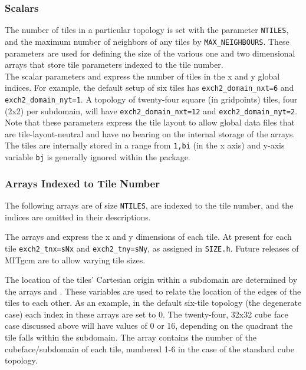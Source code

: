 \subsubsection{Scalars}

The number of tiles in a particular topology is set with the parameter
\texttt{NTILES}, and the maximum number of neighbors of any tiles by
\texttt{MAX\_NEIGHBOURS}.  These parameters are used for defining the
size of the various one and two dimensional arrays that store tile
parameters indexed to the tile number.\\

The scalar parameters 
and  express the number
of tiles in the x and y global indices.  For example, the default
setup of six tiles has \texttt{exch2\_domain\_nxt=6} and
\texttt{exch2\_domain\_nyt=1}.  A topology of twenty-four square (in
gridpoints) tiles, four (2x2) per subdomain, will have
\texttt{exch2\_domain\_nxt=12} and \texttt{exch2\_domain\_nyt=2}.
Note that these parameters express the tile layout to allow global
data files that are tile-layout-neutral and have no bearing on the
internal storage of the arrays.  The tiles are internally stored in a
range from \texttt{1,bi} (in the x axis) and y-axis variable
\texttt{bj} is generally ignored within the package.

\subsubsection{Arrays Indexed to Tile Number}

The following arrays are of size \texttt{NTILES}, are indexed to the
tile number, and the indices are omitted in their descriptions.

The arrays  and
 express the x and y dimensions of each
tile.  At present for each tile \texttt{exch2\_tnx=sNx} and
\texttt{exch2\_tny=sNy}, as assigned in \texttt{SIZE.h}.  Future
releases of MITgcm are to allow varying tile sizes.

The location of the tiles' Cartesian origin within a subdomain are
determined by the arrays  and
.  These variables are used to
relate the location of the edges of the tiles to each other.  As an
example, in the default six-tile topology (the degenerate case) each
index in these arrays are set to 0.  The twenty-four, 32x32 cube face
case discussed above will have values of 0 or 16, depending on the
quadrant the tile falls within the subdomain.  The array 
 contains the number of the
cubeface/subdomain of each tile, numbered 1-6 in the case of the
standard cube topology.

